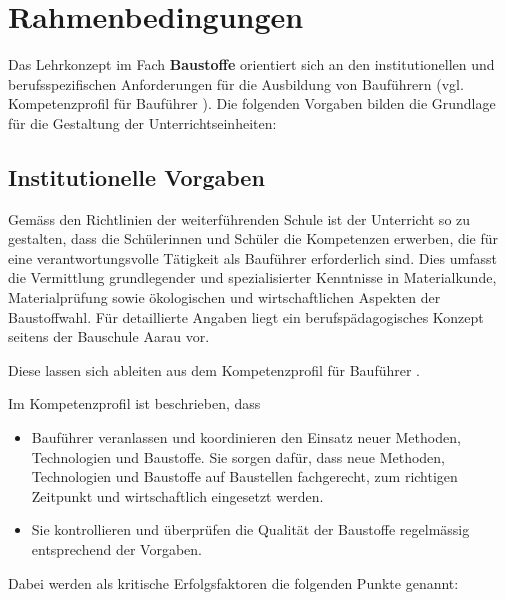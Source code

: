 \documentclass[
11pt,
captions=tableheading,
smallheadings,
headsepline,
footsepline, 
captions=tableheading,
parskip=half-,
]{scrartcl}
\begin{document}
\clearpage





\section{Rahmenbedingungen}


Das Lehrkonzept im Fach \textbf{Baustoffe} orientiert sich an den institutionellen und berufsspezifischen Anforderungen für die Ausbildung von Bauführern (vgl. Kompetenzprofil für Bauführer \cite{Kompetenzprofil_Baufuehrer}). Die folgenden Vorgaben bilden die Grundlage für die Gestaltung der Unterrichtseinheiten:

\subsection{Institutionelle Vorgaben}
Gemäss den Richtlinien der weiterführenden Schule ist der Unterricht so zu gestalten, dass die Schülerinnen und Schüler die Kompetenzen erwerben, die für eine verantwortungsvolle Tätigkeit als Bauführer erforderlich sind. Dies umfasst die Vermittlung grundlegender und spezialisierter Kenntnisse in Materialkunde, Materialprüfung sowie ökologischen und wirtschaftlichen Aspekten der Baustoffwahl.
Für detaillierte Angaben liegt ein berufspädagogisches Konzept seitens der Bauschule Aarau vor.


Diese lassen sich ableiten aus dem Kompetenzprofil für Bauführer \cite{Kompetenzprofil_Baufuehrer}.

Im Kompetenzprofil ist beschrieben, dass
\begin{itemize}
    \item Bauführer veranlassen und koordinieren den
          Einsatz neuer Methoden, Technologien und
          Baustoffe. Sie sorgen dafür, dass neue Methoden, Technologien und Baustoffe auf Baustellen fachgerecht, zum richtigen Zeitpunkt und wirtschaftlich eingesetzt werden.
    \item Sie kontrollieren und
          überprüfen die Qualität der Baustoffe regelmässig entsprechend der Vorgaben.
\end{itemize}

Dabei werden als kritische Erfolgsfaktoren die folgenden Punkte genannt:
\end{document}
